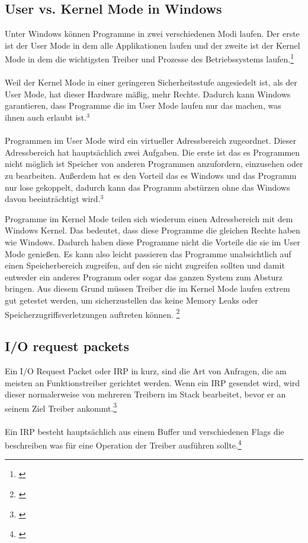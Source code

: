 \subsection{User vs. Kernel Mode in Windows}
Unter Windows können Programme in zwei verschiedenen Modi laufen. Der erste ist der User Mode in dem alle Applikationen laufen und der zweite ist der Kernel Mode in dem die wichtigsten Treiber und Prozesse des Betriebssystems laufen.\footnote[3]{\cite[Vgl.][]{21}}
\\\\
Weil der Kernel Mode in einer geringeren Sicherheitsstufe angesiedelt ist, als der User Mode, hat dieser Hardware mäßig, mehr Rechte. Dadurch kann Windows garantieren, dass Programme die im User Mode laufen nur das machen, was ihnen auch erlaubt ist.$^{3}$
\\\\
Programmen im User Mode wird ein virtueller Adressbereich zugeordnet. Dieser Adressbereich hat hauptsächlich zwei Aufgaben. Die erste ist das es Programmen nicht möglich ist Speicher von anderen Programmen anzufordern, einzusehen oder zu bearbeiten. Außerdem hat es den Vorteil das es Windows und das Programm nur lose gekoppelt, dadurch kann das Programm abstürzen ohne das Windows davon beeinträchtigt wird.$^{3}$

\newpage
\noindent
Programme im Kernel Mode teilen sich wiederum einen Adressbereich mit dem Windows Kernel. Das bedeutet, dass diese Programme die gleichen Rechte haben wie Windows. Dadurch haben diese Programme nicht die Vorteile die sie im User Mode genießen. Es kann also leicht passieren das Programme unabsichtlich auf einen Speicherbereich zugreifen, auf den sie nicht zugreifen sollten und damit entweder ein anderes Programm oder sogar das ganzen System zum Absturz bringen. Aus diesem Grund müssen Treiber die im Kernel Mode laufen extrem gut getestet werden, um sicherzustellen das keine Memory Leaks oder Speicherzugriffsverletzungen auftreten können. \footnote[1]{\cite[Vgl.][]{21}}

\subsection{I/O request packets}
Ein I/O Request Packet oder IRP in kurz, sind die Art von Anfragen, die am meisten an Funktionstreiber gerichtet werden. Wenn ein IRP gesendet wird, wird dieser normalerweise von mehreren Treibern im Stack bearbeitet, bevor er an seinem Ziel Treiber ankommt.\footnote[2]{\cite[Vgl.][]{23}}
\\\\
Ein IRP besteht hauptsächlich aus einem Buffer und verschiedenen Flags die beschreiben was für eine Operation der Treiber ausführen sollte.\footnote[3]{\cite[Vgl.][]{22}}

